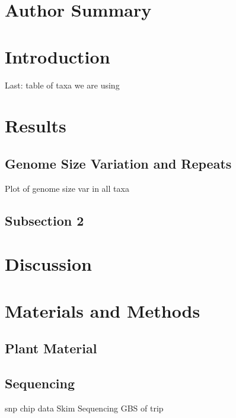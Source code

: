 \documentclass[10pt]{article}
\begin{document}
\section*{Author Summary}

\section*{Introduction}

Last: table of taxa we are using


\section*{Results}

\subsection*{Genome Size Variation and Repeats}

Plot of genome size var in all taxa

\subsection*{Subsection 2}

\section*{Discussion}

\section*{Materials and Methods}

\subsection*{Plant Material}

\subsection*{Sequencing}
snp chip data
Skim Sequencing
GBS of trip
\end{document}
